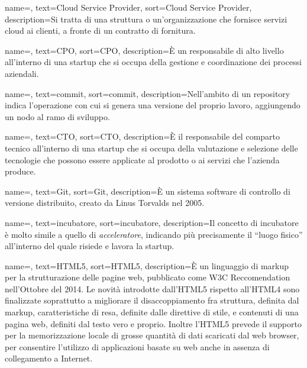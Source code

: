 {
    name=,
    text=Cloud Service Provider,
    sort=Cloud Service Provider,
    description={Si tratta di una struttura o un'organizzazione che fornisce servizi cloud ai clienti, a fronte di un contratto di fornitura.}
}

{
    name=,
    text=CPO,
    sort=CPO,
    description={È un responsabile di alto livello all'interno di una startup che si occupa della gestione e coordinazione dei processi aziendali.}
}

{
    name=,
    text=commit,
    sort=commit,
    description={Nell'ambito di un repository indica l'operazione con cui si genera una versione del proprio lavoro, aggiungendo un nodo al ramo di sviluppo.}
}

{
    name=,
    text=CTO,
    sort=CTO,
    description={È il responsabile del comparto tecnico all'interno di una startup che si occupa della valutazione e selezione delle tecnologie che possono essere applicate al prodotto o ai servizi che l'azienda produce.}
}

{
    name=,
    text=Git,
    sort=Git,
    description={È un sistema software di controllo di versione distribuito, creato da Linus Torvalds nel 2005.}
}

{
    name=,
    text=incubatore,
    sort=incubatore,
    description={Il concetto di incubatore è molto simile a quello di \textit{acceleratore}, indicando più precisamente il ``luogo fisico'' all'interno del quale risiede e lavora la startup.}
}

{
    name=,
    text=HTML5,
    sort=HTML5,
    description={È un linguaggio di markup per la strutturazione delle pagine web, pubblicato come W3C Reccomendation nell'Ottobre del 2014. Le novità introdotte dall'HTML5 rispetto all'HTML4 sono finalizzate soprattutto a migliorare il disaccoppiamento fra struttura, definita dal markup, caratteristiche di resa, definite dalle direttive di stile, e contenuti di una pagina web, definiti dal testo vero e proprio. Inoltre l'HTML5 prevede il supporto per la memorizzazione locale di grosse quantità di dati scaricati dal web browser, per consentire l'utilizzo di applicazioni basate su web anche in assenza di collegamento a Internet.}
}

